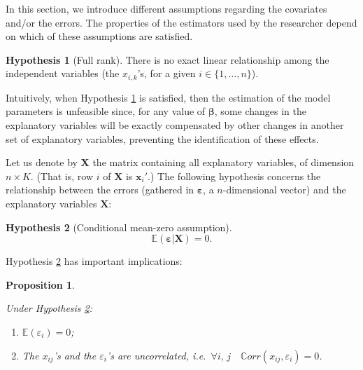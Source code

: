 \documentclass[
  12pt,
]{book}
\providecommand{\tightlist}{%
  \setlength{\itemsep}{0pt}\setlength{\parskip}{0pt}}
\newtheorem{proposition}{Proposition}[chapter]
\theoremstyle{definition}
\theoremstyle{definition}
\theoremstyle{definition}
\theoremstyle{definition}
\newtheorem{hypothesis}{Hypothesis}[chapter]
\theoremstyle{remark}
\begin{document}
In this section, we introduce different assumptions regarding the covariates and/or the errors. The properties of the estimators used by the researcher depend on which of these assumptions are satisfied.

\begin{hypothesis}[Full rank]
\protect\hypertarget{hyp:fullrank}{}\label{hyp:fullrank}There is no exact linear relationship among the independent variables (the \(x_{i,k}\)'s, for a given \(i \in \{1,\dots,n\}\)).
\end{hypothesis}

Intuitively, when Hypothesis \ref{hyp:fullrank} is satisfied, then the estimation of the model parameters is unfeasible since, for any value of \(\boldsymbol\beta\), some changes in the explanatory variables will be exactly compensated by other changes in another set of explanatory variables, preventing the identification of these effects.

Let us denote by \(\mathbf{X}\) the matrix containing all explanatory variables, of dimension \(n \times K\). (That is, row \(i\) of \(\mathbf{X}\) is \(\mathbf{x}_i'\).) The following hypothesis concerns the relationship between the errors (gathered in \(\boldsymbol\varepsilon\), a \(n\)-dimensional vector) and the explanatory variables \(\mathbf{X}\):

\begin{hypothesis}[Conditional mean-zero assumption]
\protect\hypertarget{hyp:exogeneity}{}\label{hyp:exogeneity}\begin{equation}
\mathbb{E}(\boldsymbol\varepsilon|\mathbf{X}) = 0.
\end{equation}
\end{hypothesis}

Hypothesis \ref{hyp:exogeneity} has important implications:

\begin{proposition}
\protect\hypertarget{prp:implicationExog}{}\label{prp:implicationExog}

Under Hypothesis \ref{hyp:exogeneity}:

\begin{enumerate}
\def\labelenumi{\roman{enumi}.}
\tightlist
\item
  \(\mathbb{E}(\varepsilon_{i})=0\);
\item
  The \(x_{ij}\)'s and the \(\varepsilon_{i}\)'s are uncorrelated, i.e.~\(\forall i,\,j \quad \mathbb{C}orr(x_{ij},\varepsilon_{i})=0\).
\end{enumerate}

\end{proposition}
\end{document}
